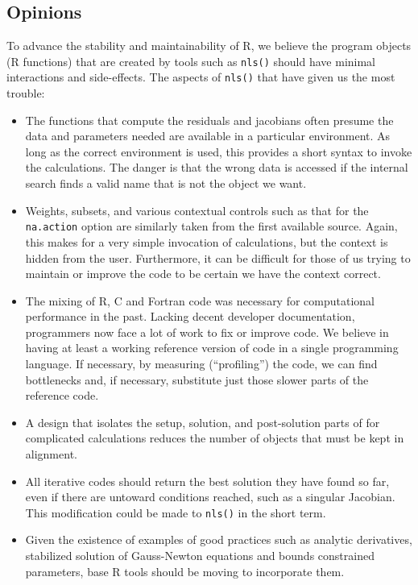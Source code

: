 \documentclass[
]{article}
\begin{document}
\hypertarget{opinions}{%
\subsection{Opinions}\label{opinions}}

To advance the stability and maintainability of R, we believe the
program objects (R functions) that are created by tools such as
\texttt{nls()} should have minimal interactions and side-effects. The
aspects of \texttt{nls()} that have given us the most trouble:

\begin{itemize}
\item
  The functions that compute the residuals and jacobians often presume
  the data and parameters needed are available in a particular
  environment. As long as the correct environment is used, this provides
  a short syntax to invoke the calculations. The danger is that the
  wrong data is accessed if the internal search finds a valid name that
  is not the object we want.
\item
  Weights, subsets, and various contextual controls such as that for the
  \texttt{na.action} option are similarly taken from the first available
  source. Again, this makes for a very simple invocation of
  calculations, but the context is hidden from the user. Furthermore, it
  can be difficult for those of us trying to maintain or improve the
  code to be certain we have the context correct.
\item
  The mixing of R, C and Fortran code was necessary for computational
  performance in the past. Lacking decent developer documentation,
  programmers now face a lot of work to fix or improve code. We believe
  in having at least a working reference version of code in a single
  programming language. If necessary, by measuring (``profiling'') the
  code, we can find bottlenecks and, if necessary, substitute just those
  slower parts of the reference code.
\item
  A design that isolates the setup, solution, and post-solution parts of
  for complicated calculations reduces the number of objects that must
  be kept in alignment.
\item
  All iterative codes should return the best solution they have found so
  far, even if there are untoward conditions reached, such as a singular
  Jacobian. This modification could be made to \texttt{nls()} in the
  short term.
\item
  Given the existence of examples of good practices such as analytic
  derivatives, stabilized solution of Gauss-Newton equations and bounds
  constrained parameters, base R tools should be moving to incorporate
  them.
\end{itemize}
\end{document}
